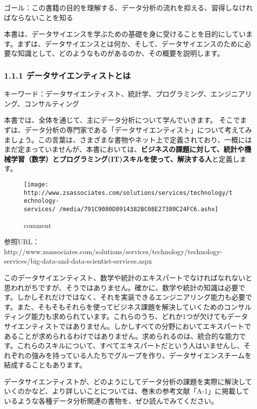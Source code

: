\documentclass[11pt]{article}
\makeatletter
\def\maxwidth{\ifdim\Gin@nat@width>\linewidth\linewidth
    \else\Gin@nat@width\fi}
\let\Oldincludegraphics\includegraphics
\renewcommand{\includegraphics}[1]{\Oldincludegraphics[width=.8\maxwidth]{#1}}
\makeatother
\begin{document}
ゴール：この書籍の目的を理解する、データ分析の流れを抑える、習得しなければならないことを知る

    本書は、データサイエンスを学ぶための基礎を身に受けることを目的にしています。まずは、データサイエンスとは何か、そして、データサイエンスのために必要な知識として、どのようなものがあるのか、その概要を説明します。

    \subsubsection{1.1.1
データサイエンティストとは}\label{ux30c7ux30fcux30bfux30b5ux30a4ux30a8ux30f3ux30c6ux30a3ux30b9ux30c8ux3068ux306f}

キーワード：データサイエンティスト、統計学、プログラミング、エンジニアリング、コンサルティング

    本書では、全体を通じて、主にデータ分析について学んでいきます。
そこでまずは、データ分析の専門家である「データサイエンティスト」について考えてみましょう。この言葉は、さまざまな書物やネット上で定義されており、一概にはまだ定まっていませんが、本書においては、\textbf{ビジネスの課題に対して、統計や機械学習（数学）とプログラミング(IT)スキルを使って、解決する人}と定義します。

    \begin{figure}
\centering
\texttt{[image: http://www.zsassociates.com/solutions/services/technology/technology-services/~/media/791C9080D8914382BC08E27380C24FC6.ashx]}
\caption{comment}
\end{figure}

    参照URL：http://www.zsassociates.com/solutions/services/technology/technology-services/big-data-and-data-scientist-services.aspx

    このデータサイエンティスト、数学や統計のエキスパートでなければなれないと思われがちですが、そうではありません。確かに、数学や統計の知識は必要です。しかしそれだけではなく、それを実装できるエンジニアリング能力も必要です。また、そもそもそれらを使ってビジネス課題を解決していくためのコンサルティング能力も求められています。これらのうち、どれか1つが欠けてもデータサイエンティストではありません。しかしすべての分野においてエキスパートであることが求められるわけではありません。求められるのは、統合的な能力です。これらのスキルについて、すべてエキスパートだという人はいませんし、それぞれの強みを持っている人たちでグループを作り、データサイエンスチームを結成することもあります。

データサイエンティストが、どのようにしてデータ分析の課題を実際に解決していくのかなど、より詳しいことについては、巻末の参考文献「A-1」に掲載しているような各種データ分析関連の書物を、ぜひ読んでみてください。
\end{document}
